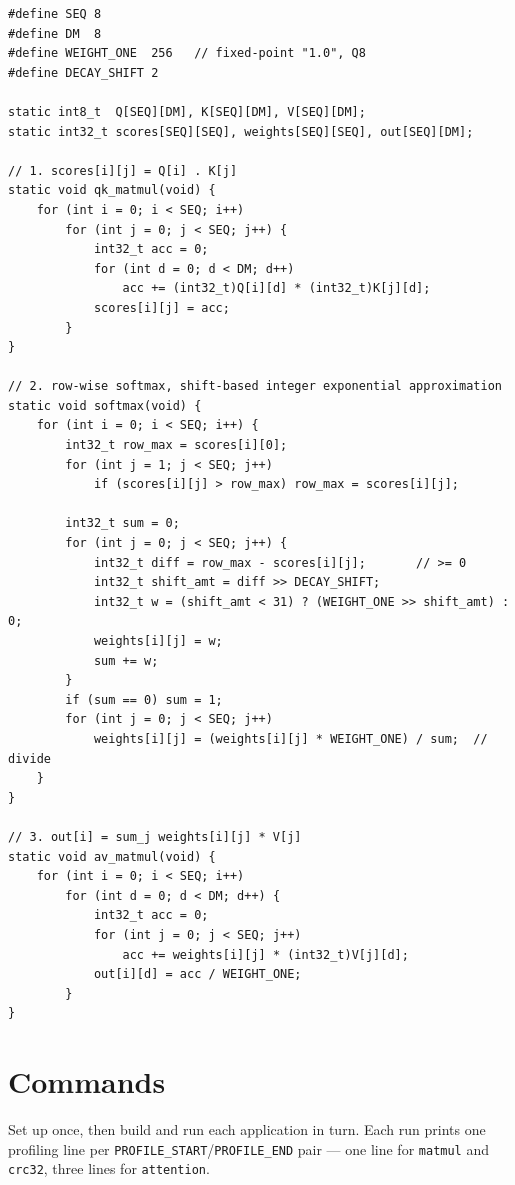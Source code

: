 \documentclass[11pt]{article}
\newcommand{\code}[1]{\texttt{#1}}
\begin{document}
\begin{lstlisting}[style=clisting]
#define SEQ 8
#define DM  8
#define WEIGHT_ONE  256   // fixed-point "1.0", Q8
#define DECAY_SHIFT 2

static int8_t  Q[SEQ][DM], K[SEQ][DM], V[SEQ][DM];
static int32_t scores[SEQ][SEQ], weights[SEQ][SEQ], out[SEQ][DM];

// 1. scores[i][j] = Q[i] . K[j]
static void qk_matmul(void) {
    for (int i = 0; i < SEQ; i++)
        for (int j = 0; j < SEQ; j++) {
            int32_t acc = 0;
            for (int d = 0; d < DM; d++)
                acc += (int32_t)Q[i][d] * (int32_t)K[j][d];
            scores[i][j] = acc;
        }
}

// 2. row-wise softmax, shift-based integer exponential approximation
static void softmax(void) {
    for (int i = 0; i < SEQ; i++) {
        int32_t row_max = scores[i][0];
        for (int j = 1; j < SEQ; j++)
            if (scores[i][j] > row_max) row_max = scores[i][j];

        int32_t sum = 0;
        for (int j = 0; j < SEQ; j++) {
            int32_t diff = row_max - scores[i][j];       // >= 0
            int32_t shift_amt = diff >> DECAY_SHIFT;
            int32_t w = (shift_amt < 31) ? (WEIGHT_ONE >> shift_amt) : 0;
            weights[i][j] = w;
            sum += w;
        }
        if (sum == 0) sum = 1;
        for (int j = 0; j < SEQ; j++)
            weights[i][j] = (weights[i][j] * WEIGHT_ONE) / sum;  // divide
    }
}

// 3. out[i] = sum_j weights[i][j] * V[j]
static void av_matmul(void) {
    for (int i = 0; i < SEQ; i++)
        for (int d = 0; d < DM; d++) {
            int32_t acc = 0;
            for (int j = 0; j < SEQ; j++)
                acc += weights[i][j] * (int32_t)V[j][d];
            out[i][d] = acc / WEIGHT_ONE;
        }
}
\end{lstlisting}

\section{Commands}

Set up once, then build and run each application in turn. Each run prints one
profiling line per \code{PROFILE\_START}/\code{PROFILE\_END} pair --- one line
for \code{matmul} and \code{crc32}, three lines for \code{attention}.
\end{document}
